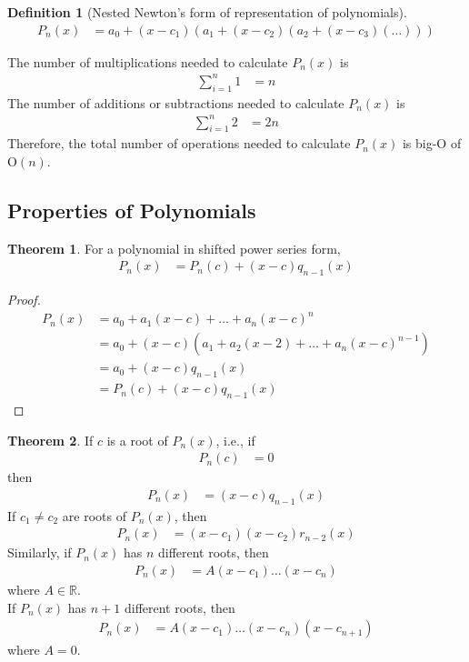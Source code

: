 \documentclass[fleqn, a4paper, 12pt, twoside, titlepage]{article}
\theoremstyle{definition}
\newtheorem{definition}{Definition}
\theoremstyle{theorem}
\newtheorem{theorem}{Theorem}
\begin{document}
\begin{definition}[Nested Newton's form of representation of polynomials]
	\begin{align*}
		P_n(x) &= a_0 + (x - c_1) \left( a_1 + (x - c_2) \left( a_2 + (x - c_3) \left( \dots \right) \right) \right)
	\end{align*}
\end{definition}

The number of multiplications needed to calculate $P_n(x)$ is 
\begin{align*}
	\sum\limits_{i = 1}^{n} 1 &= n
\end{align*}
The number of additions or subtractions needed to calculate $P_n(x)$ is 
\begin{align*}
	\sum\limits_{i = 1}^{n} 2 &= 2 n
\end{align*}
Therefore, the total number of operations needed to calculate $P_n(x)$ is big-O of $\mathrm{O}(n)$.

\subsection{Properties of Polynomials}

\begin{theorem}
	For a polynomial in shifted power series form,
	\begin{align*}
		P_n(x) &= P_n(c) + (x - c) q_{n - 1}(x)
	\end{align*}
\end{theorem}

\begin{proof}
	\begin{align*}
		P_n(x) &= a_0 + a_1 (x - c) + \dots + a_n(x - c)^n\\
		&= a_0 + (x - c) \left( a_1 + a_2 (x - 2) + \dots + a_n (x - c)^{n - 1} \right)\\
		&= a_0 + (x - c) q_{n - 1}(x)\\
		&= P_n(c) + (x - c) q_{n - 1}(x)
	\end{align*}
\end{proof}

\begin{theorem}
	If $c$ is a root of $P_n(x)$, i.e., if
	\begin{align*}
		P_n(c) &= 0
	\end{align*}
	then
	\begin{align*}
		P_n(x) &= (x - c) q_{n - 1}(x)
	\end{align*}
	If $c_1 \neq c_2$ are roots of $P_n(x)$, then
	\begin{align*}
		P_n(x) &= (x - c_1) (x - c_2) r_{n - 2}(x)
	\end{align*}
	Similarly, if $P_n(x)$ has $n$ different roots, then
	\begin{align*}
		P_n(x) &= A (x - c_1) \dots (x - c_n)
	\end{align*}
	where $A \in \mathbb{R}$.\\
	If $P_n(x)$ has $n + 1$ different roots, then
	\begin{align*}
		P_n(x) &= A (x - c_1) \dots (x - c_n) (x - c_{n + 1})
	\end{align*}
	where $A = 0$.
\end{theorem}
\end{document}
